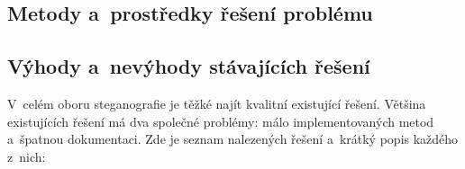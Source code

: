 \blindtext

\subsection*{Metody a~prostředky řešení problému}
\label{sub:problem-solution}

\blindtext

\subsection*{Výhody a~nevýhody stávajících řešení}
\label{sub:pros-cons-existing-solutions}

V~celém oboru steganografie je těžké najít kvalitní existující řešení. Většina
existujících řešení má dva společné problémy: málo implementovaných metod
a~špatnou dokumentaci. Zde je seznam nalezených řešení a~krátký popis každého
z~nich:

